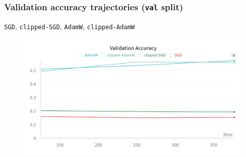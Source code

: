 \begin{frame}
    \frametitle{Validation accuracy trajectories (\texttt{val} split)}
    \texttt{SGD}, \texttt{clipped-SGD}, \texttt{AdamW}, \texttt{clipped-AdamW}
    \begin{figure}[htpb]
        \begin{center}
            \includegraphics[width=\linewidth]
                {pics/experiments/val_accuracy_good}
        \end{center}
    \end{figure}
\end{frame}

